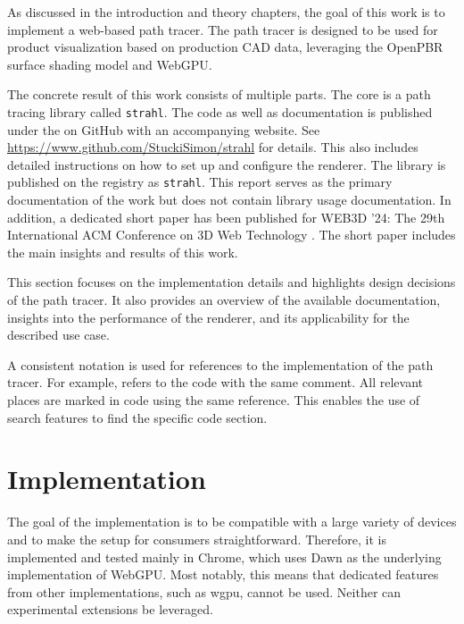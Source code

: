 
As discussed in the introduction and theory chapters, the goal of this work is to implement a web-based path tracer. The path tracer is designed to be used for product visualization based on production \gls{CAD} data, leveraging the \gls{OpenPBR} surface shading model and \gls{WebGPU}.

The concrete result of this work consists of multiple parts. The core is a path tracing library called \texttt{strahl}. The code as well as documentation is published under the  on GitHub with an accompanying website. See \url{https://www.github.com/StuckiSimon/strahl} for details. This also includes detailed instructions on how to set up and configure the renderer. The library is published on the  registry as \texttt{strahl}. This report serves as the primary documentation of the work but does not contain library usage documentation. In addition, a dedicated short paper has been published for WEB3D '24: The 29th International ACM Conference on 3D Web Technology \cite{ownShortPaper}. The short paper includes the main insights and results of this work.

This section focuses on the implementation details and highlights design decisions of the path tracer. It also provides an overview of the available documentation, insights into the performance of the renderer, and its applicability for the described use case.

A consistent notation is used for references to the implementation of the path tracer. For example,  refers to the code with the same comment. All relevant places are marked in code using the same reference. This enables the use of search features to find the specific code section.

\section{Implementation}

The goal of the implementation is to be compatible with a large variety of devices and to make the setup for consumers straightforward. Therefore, it is implemented and tested mainly in Chrome, which uses \gls{Dawn} as the underlying implementation of \gls{WebGPU}. Most notably, this means that dedicated features from other implementations, such as \gls{wgpu}, cannot be used. Neither can experimental extensions be leveraged.

